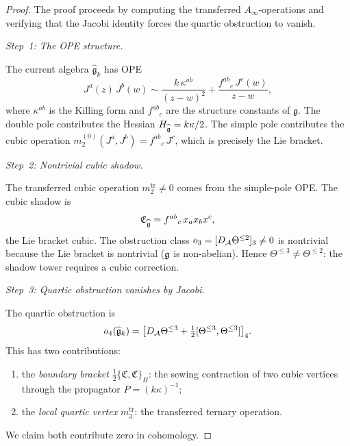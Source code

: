 \begin{proof}
The proof proceeds by computing the
transferred $A_\infty$-operations and verifying that the
Jacobi identity forces the quartic obstruction to vanish.

\medskip
\emph{Step~1: The OPE structure.}

The current algebra $\widehat{\mathfrak{g}}_k$ has OPE
\begin{equation}\label{eq:km-ope-recall}
J^a(z)\,J^b(w)
\sim \frac{k\,\kappa^{ab}}{(z-w)^2}
+ \frac{f^{ab}{}_c\,J^c(w)}{z-w},
\end{equation}
where $\kappa^{ab}$ is the Killing form and $f^{ab}{}_c$
are the structure constants of $\mathfrak{g}$. The double
pole contributes the Hessian $H_{\widehat{\mathfrak{g}}} = k\kappa/2$.
The simple pole contributes the cubic operation
$m_2^{(0)}(J^a, J^b) = f^{ab}{}_c\,J^c$, which is
precisely the Lie bracket.

\medskip
\emph{Step~2: Nontrivial cubic shadow.}

The transferred cubic operation
$m_2^{\mathrm{tr}} \neq 0$ comes from the simple-pole
OPE. The cubic shadow is
\begin{equation}\label{eq:km-cubic-shadow}
\mathfrak{C}_{\widehat{\mathfrak{g}}} =
f^{ab}{}_c\,x_a x_b x^c,
\end{equation}
the Lie bracket cubic. The obstruction class
$o_3 = [D_{\mathcal{A}} \Theta^{\leq 2}]_3 \neq 0$ is nontrivial
because the Lie bracket is nontrivial ($\mathfrak{g}$ is non-abelian).
Hence $\Theta^{\leq 3} \neq \Theta^{\leq 2}$: the shadow
tower requires a cubic correction.

\medskip
\emph{Step~3: Quartic obstruction vanishes by Jacobi.}

The quartic obstruction is
\begin{equation}\label{eq:km-quartic-obstruction}
o_4(\widehat{\mathfrak{g}}_k) =
\bigl[D_{\mathcal{A}} \Theta^{\leq 3}
+ \tfrac{1}{2}[\Theta^{\leq 3}, \Theta^{\leq 3}]
\bigr]_4.
\end{equation}
This has two contributions:
\begin{enumerate}[label=(\alph*)]
\item the \emph{boundary bracket}
 $\frac{1}{2}\{\mathfrak{C}, \mathfrak{C}\}_H$:
 the sewing contraction of two cubic vertices through
 the propagator $P = (k\kappa)^{-1}$;
\item the \emph{local quartic vertex}
 $m_3^{\mathrm{tr}}$: the transferred ternary operation.
\end{enumerate}

We claim both contribute zero in cohomology.


\end{proof}
